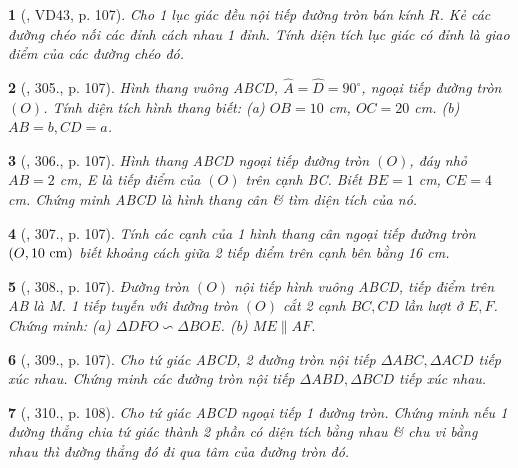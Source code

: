 \documentclass{article}
\newtheorem{baitoan}{}
\begin{document}
\begin{baitoan}[\cite{Binh_Toan_9_tap_2}, VD43, p. 107]
	Cho 1 lục giác đều nội tiếp đường tròn bán kính $R$. Kẻ các đường chéo nối các đỉnh cách nhau 1 đỉnh. Tính diện tích lục giác có đỉnh là giao điểm của các đường chéo đó.
\end{baitoan}

\begin{baitoan}[\cite{Binh_Toan_9_tap_2}, 305., p. 107]
	Hình thang vuông ABCD, $\widehat{A} = \widehat{D} = 90^\circ$, ngoại tiếp đường tròn $(O)$. Tính diện tích hình thang biết: (a) $OB = 10$ {\rm cm}, $OC = 20$ {\rm cm}. (b) $AB = b,CD = a$.
\end{baitoan}

\begin{baitoan}[\cite{Binh_Toan_9_tap_2}, 306., p. 107]
	Hình thang ABCD ngoại tiếp đường tròn $(O)$, đáy nhỏ $AB = 2$ {\rm cm}, E là tiếp điểm của $(O)$ trên cạnh BC. Biết $BE = 1$ {\rm cm}, $CE = 4$ {\rm cm}. Chứng minh ABCD là hình thang cân \& tìm diện tích của nó.
\end{baitoan}

\begin{baitoan}[\cite{Binh_Toan_9_tap_2}, 307., p. 107]
	Tính các cạnh của 1 hình thang cân ngoại tiếp đường tròn $(O,10\ {\rm cm})$ biết khoảng cách giữa 2 tiếp điểm trên cạnh bên bằng {\rm16 cm}.
\end{baitoan}

\begin{baitoan}[\cite{Binh_Toan_9_tap_2}, 308., p. 107]
	Đường tròn $(O)$ nội tiếp hình vuông ABCD, tiếp điểm trên AB là M. 1 tiếp tuyến với đường tròn $(O)$ cắt 2 cạnh $BC,CD$ lần lượt ở $E,F$. Chứng minh: (a) $\Delta DFO\backsim\Delta BOE$. (b) $ME\parallel AF$.
\end{baitoan}

\begin{baitoan}[\cite{Binh_Toan_9_tap_2}, 309., p. 107]
	Cho tứ giác ABCD, 2 đường tròn nội tiếp $\Delta ABC,\Delta ACD$ tiếp xúc nhau. Chứng minh các đường tròn nội tiếp $\Delta ABD,\Delta BCD$ tiếp xúc nhau.
\end{baitoan}

\begin{baitoan}[\cite{Binh_Toan_9_tap_2}, 310., p. 108]
	Cho tứ giác ABCD ngoại tiếp 1 đường tròn. Chứng minh nếu 1 đường thẳng chia tứ giác thành 2 phần có diện tích bằng nhau \& chu vi bằng nhau thì đường thẳng đó đi qua tâm của đường tròn đó.
\end{baitoan}
\end{document}
